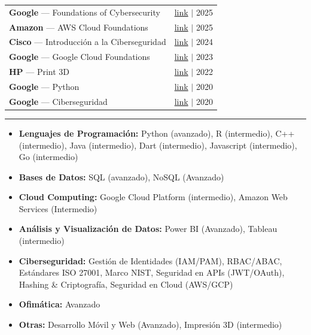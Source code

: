 \documentclass[11pt, a4paper]{article}
\begin{document}
\begin{tabularx}{\linewidth}{@{}X r@{}}
  \textbf{Google} --- Foundations of Cybersecurity & \href{https://drive.google.com/}{\textcolor{linkblue}{link}} $|$ 2025 \\
  \textbf{Amazon} --- AWS Cloud Foundations & \href{https://drive.google.com/}{\textcolor{linkblue}{link}} $|$ 2025 \\
  \textbf{Cisco} --- Introducción a la Ciberseguridad & \href{https://drive.google.com/}{\textcolor{linkblue}{link}} $|$ 2024 \\
  \textbf{Google} --- Google Cloud Foundations & \href{https://drive.google.com/}{\textcolor{linkblue}{link}} $|$ 2023 \\
  \textbf{HP} --- Print 3D & \href{https://drive.google.com/}{\textcolor{linkblue}{link}} $|$ 2022 \\
  \textbf{Google} --- Python & \href{https://drive.google.com/}{\textcolor{linkblue}{link}} $|$ 2020 \\
  \textbf{Google} --- Ciberseguridad & \href{https://drive.google.com/}{\textcolor{linkblue}{link}} $|$ 2020 \\
\end{tabularx}


\vspace{6pt}\vspace{2pt}\hrule\vspace{4pt}

\vspace{2pt}

\begin{itemize}[leftmargin=1.5em, itemsep=1pt, topsep=2pt]
  \item \textbf{Lenguajes de Programación:} Python (avanzado), R (intermedio), C++ (intermedio), Java (intermedio), Dart (intermedio), Javascript (intermedio), Go (intermedio)
  \item \textbf{Bases de Datos:} SQL (avanzado), NoSQL (Avanzado)
  \item \textbf{Cloud Computing:} Google Cloud Platform (intermedio), Amazon Web Services (Intermedio)
  \item \textbf{Análisis y Visualización de Datos:} Power BI (Avanzado), Tableau (intermedio)
  \item \textbf{Ciberseguridad:} Gestión de Identidades (IAM/PAM), RBAC/ABAC, Estándares ISO 27001, Marco NIST, Seguridad en APIs (JWT/OAuth), Hashing \& Criptografía, Seguridad en Cloud (AWS/GCP)
  \item \textbf{Ofimática:} Avanzado
  \item \textbf{Otras:} Desarrollo Móvil y Web (Avanzado), Impresión 3D (intermedio)
\end{itemize}
\end{document}
